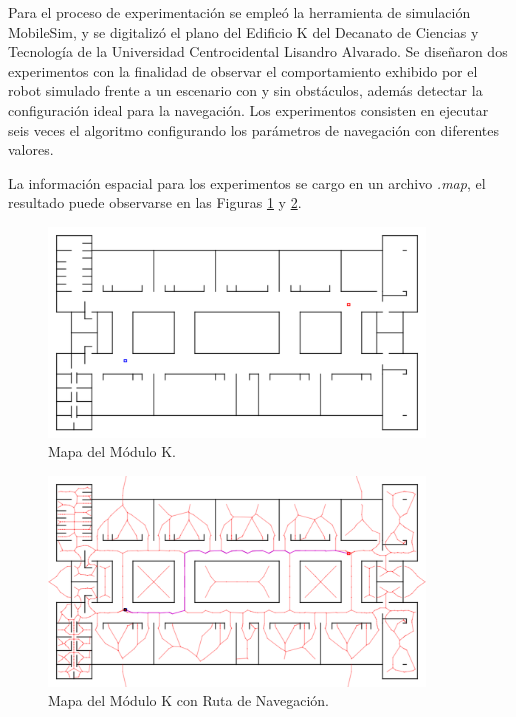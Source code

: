 \documentclass[11pt,twoside,A5]{article}
\begin{document}
Para el proceso de experimentación se empleó la herramienta de simulación MobileSim, y se digitalizó el plano del 
Edificio K del Decanato de Ciencias y Tecnología de la Universidad Centrocidental Lisandro Alvarado. Se diseñaron
dos experimentos con la finalidad de observar el comportamiento exhibido por el robot simulado frente a un escenario
con y sin obstáculos, además detectar la configuración ideal para la navegación.
Los experimentos consisten en ejecutar seis veces el algoritmo configurando los parámetros 
de navegación con diferentes valores.

La información espacial para los experimentos se cargo en un archivo \textit{.map}, el resultado puede observarse 
en las Figuras \ref{fig:mapa-k} y \ref{fig:mapa-k-ruta}.

\begin{figure}[H]
\begin{center}
\includegraphics[width=10cm]{mapa-k.png} 
\caption{Mapa del Módulo K.}
\label{fig:mapa-k}
\end{center}
\end{figure} 

\begin{figure}[H]
\begin{center}
\includegraphics[width=10cm]{mapa-k-ruta.png} 
\caption{Mapa del Módulo K con Ruta de Navegación.}
\label{fig:mapa-k-ruta}
\end{center}
\end{figure} 
\end{document}
